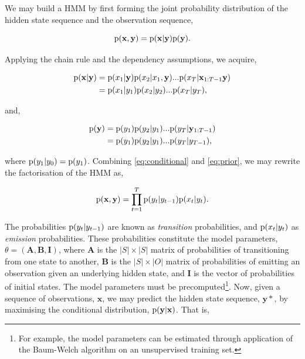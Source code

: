 We may build a HMM by first forming the joint probability distribution of the hidden state sequence and the observation sequence,

\begin{equation}
\text{p}(\mathbf{x}, \mathbf{y}) = \text{p}(\mathbf{x} | \mathbf{y}) \text{p}(\mathbf{y}).
\label{eq:joint}
\end{equation}

Applying the chain rule and the dependency assumptions, we acquire,

\begin{equation}
\begin{aligned}
\text{p}(\mathbf{x} | \mathbf{y}) &= \text{p}(x_1|\mathbf{y}) \text{p}(x_2|x_1, \mathbf{y}) ... \text{p}(x_T|\mathbf{x}_{1:T-1}\mathbf{y}) \\
&= \text{p}(x_1|y_1) \text{p}(x_2|y_2) ... \text{p}(x_T|y_T),
\end{aligned}
\label{eq:conditional}
\end{equation}

and,

\begin{equation}
\begin{aligned}
\text{p}(\mathbf{y}) &= \text{p}(y_1) \text{p}(y_2|y_1) ... \text{p}(y_T|\mathbf{y}_{1:T-1}) \\
&= \text{p}(y_1) \text{p}(y_2|y_1) ... \text{p}(y_T|y_{T-1}),
\end{aligned}
\label{eq:prior}
\end{equation}

where $\text{p}(y_1|y_0) = \text{p}(y_1)$. Combining \ref{eq:conditional} and \ref{eq:prior}, we may rewrite the factorisation of the HMM as,

\begin{equation}
\text{p}(\mathbf{x}, \mathbf{y}) = \prod_{t=1}^T \text{p}(y_t | y_{t-1})\text{p}(x_t | y_t).
\label{eq:factorisedHMM}
\end{equation}

The probabilities $\text{p}(y_t | y_{t-1})$ are known as \emph{transition} probabilities, and $\text{p}(x_t | y_t) $ as \emph{emission} probabilities. These probabilities constitute the model parameters, $\theta = (\mathbf{A}, \mathbf{B}, \mathbf{I})$, where $\mathbf{A}$ is the $|S| \times |S|$ matrix of probabilities of transitioning from one state to another, $\mathbf{B}$ is the $|S| \times |O|$ matrix of probabilities of emitting an observation given an underlying hidden state, and $\mathbf{I}$ is the vector of probabilities of initial states. The model parameters must be precomputed\footnote{For example, the model parameters can be estimated through application of the Baum-Welch algorithm on an unsupervised training set.}. Now, given a sequence of observations, $\textbf{x}$, we may predict the hidden state sequence, $\mathbf{y}*$, by maximising the conditional distribution, $\text{p}(\mathbf{y} | \mathbf{x})$. That is,

